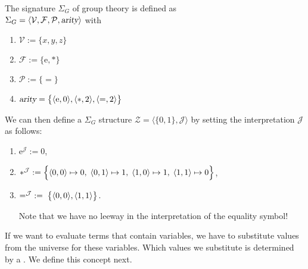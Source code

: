 \example
The signature $\Sigma_G$ of group theory is defined as \\[0.2cm]
\hspace*{1.3cm} $\Sigma_G = \langle \mathcal{V}, \mathcal{F}, \mathcal{P},\textsl{arity}\rangle$ 
\quad with
\begin{enumerate}
\item $\mathcal{V} := \{ x, y, z \}$
\item $\mathcal{F} := \{ \mathrm{e}, * \}$
\item $\mathcal{P} := \{ \mathtt{=} \}$
\item $\textsl{arity} = \bigl\{ \pair(\mathrm{e},0), \pair(*,2), \pair(\mathtt{=},2)\bigr\}$
\end{enumerate}
We can then define a $\Sigma_G$ structure $\mathcal{Z} = \langle \{0,1\},\mathcal{J}\rangle$ 
by setting the interpretation $\mathcal{J}$ 
as follows:
\begin{enumerate}
\item $\mathrm{e}^\mathcal{J} := 0$,
\item $*^\mathcal{J} := \Bigl\{ \pair(0,0) \mapsto 0,\;
                                 \pair(0,1) \mapsto 1,\;
                                 \pair(1,0) \mapsto 1,\;
                                 \pair(1,1) \mapsto 0 \Bigr\}$,
\item $=^\mathcal{J} \;:=\; \bigl\{ \pair(0,0), \pair(1,1) \bigr\}$.
                                 
      Note that we have no leeway in the interpretation of the equality symbol! \eox
\end{enumerate}

If we want to evaluate terms that contain variables, we have to substitute values from the universe 
for these variables. Which values we substitute is determined by a .  We define this concept next. 

